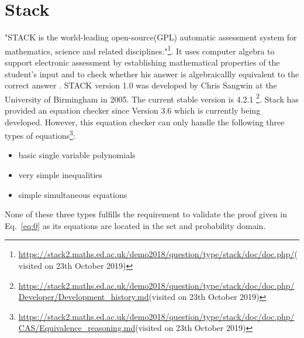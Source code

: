     \section{Stack}
    "STACK is the world-leading open-source(GPL) automatic assessment system for mathematics, science and related disciplines."\footnote{\url{https://stack2.maths.ed.ac.uk/demo2018/question/type/stack/doc/doc.php/}(visited on 23th October 2019)}.
    It uses computer algebra to support electronic assessment by establishing mathematical properties of the student's input and to check
    whether his answer is algebraicallly equivalent to the correct answer \cite[~p.213]{sangwin2017asymmetry}. STACK version 1.0 was developed by Chris Sangwin at the University
    of Birmingham in 2005. The current stable version is 4.2.1 \footnote{\url{https://stack2.maths.ed.ac.uk/demo2018/question/type/stack/doc/doc.php/Developer/Development_history.md}(visited on 23th October 2019)}.
    Stack has provided an equation checker since Version 3.6 which is currently being developed.
    However, this equation checker can only handle the following three types of equations\footnote{\url{https://stack2.maths.ed.ac.uk/demo2018/question/type/stack/doc/doc.php/CAS/Equivalence_reasoning.md}(visited on 23th October 2019)}:
    \begin{itemize}
        \item basic single variable polynomials
        \item very simple inequalities
        \item simple simultaneous equations
    \end{itemize}
    None of these three types fulfills the requirement to validate the proof given in Eq.~\eqref{eq:0} as its equations are located in the set and probability
    domain.
